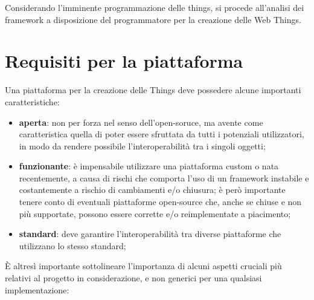 \documentclass[12pt,a4paper,openright,oneside]{report}
\begin{document}
Considerando l'imminente programmazione delle things, si procede all'analisi dei framework a disposizione del programmatore per la creazione delle Web Things.

\section{Requisiti per la piattaforma}
\label{sec:iot_platform}
Una piattaforma per la creazione delle Things deve possedere alcune importanti caratteristiche:

\begin{itemize}
	\setlength\itemsep{0em}
	\item \textbf{aperta}: non per forza nel senso dell'open-soruce, ma avente come caratteristica quella di poter essere sfruttata da tutti i potenziali utilizzatori, in modo da rendere possibile l'interoperabilità tra i singoli oggetti;

	\item \textbf{funzionante}: è impensabile utilizzare una piattaforma custom o nata recentemente, a causa di rischi che comporta l'uso di un framework instabile e costantemente a rischio di cambiamenti e/o chiusura; è però importante tenere conto di eventuali piattaforme open-source che, anche se chiuse e non più supportate, possono essere corrette e/o reimplementate a piacimento;
	
	\item \textbf{standard}: deve garantire l'interoperabilità tra diverse piattaforme che utilizzano lo stesso standard;
\end{itemize}

È altresì importante sottolineare l'importanza di alcuni aspetti cruciali più relativi al progetto in considerazione, e non generici per una qualsiasi implementazione:
\end{document}
